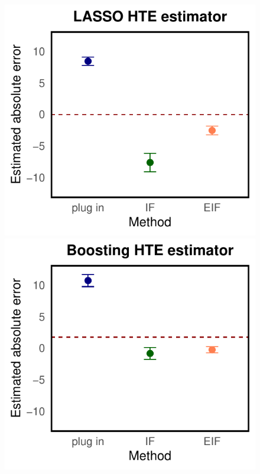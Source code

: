\documentclass{article}
\theoremstyle{plain}
\theoremstyle{definition}
\theoremstyle{plain}
\begin{document}
\begin{figure}[h]
        \centering
        \begin{minipage}{0.3\textwidth}
                \centering
                \includegraphics[clip, trim = 0cm 0cm 0cm 0cm, width = \textwidth]{plot/inaccurate_nuisance_function_estimator_absolute_LASSO.pdf}
        \end{minipage}
        \begin{minipage}{0.3\textwidth}
                \centering
                \includegraphics[clip, trim = 0cm 0cm 0cm 0cm, width = \textwidth]{plot/inaccurate_nuisance_function_estimator_absolute_xgboost.pdf}

\end{minipage}
\end{figure}
\end{document}
